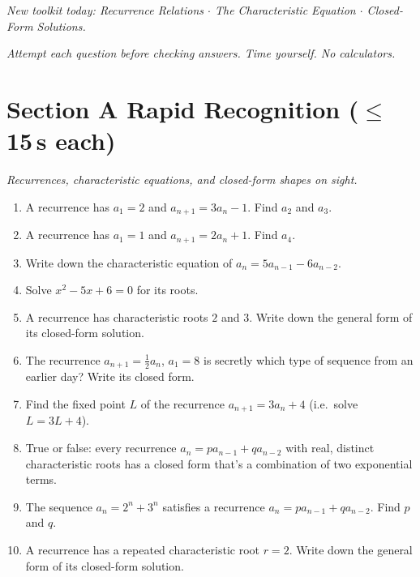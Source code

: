 \documentclass[11pt,a4paper]{article}
\begin{document}
\noindent\textit{New toolkit today: Recurrence Relations $\cdot$ The Characteristic Equation $\cdot$ Closed-Form Solutions.}

\vspace{2pt}
\noindent\textit{Attempt each question before checking answers. Time yourself. No calculators.}

\section*{Section A \quad Rapid Recognition \hfill{\normalfont\small($\leq$15\,s each)}}

\noindent\textit{Recurrences, characteristic equations, and closed-form shapes on sight.}

\begin{enumerate}

\item A recurrence has $a_1=2$ and $a_{n+1}=3a_n-1$. Find $a_2$ and $a_3$.

\item A recurrence has $a_1=1$ and $a_{n+1}=2a_n+1$. Find $a_4$.

\item Write down the characteristic equation of $a_n=5a_{n-1}-6a_{n-2}$.

\item Solve $x^2-5x+6=0$ for its roots.

\item A recurrence has characteristic roots $2$ and $3$. Write down the general form of its closed-form solution.

\item The recurrence $a_{n+1}=\tfrac12a_n$, $a_1=8$ is secretly which type of sequence from an earlier day? Write its closed form.

\item Find the fixed point $L$ of the recurrence $a_{n+1}=3a_n+4$ (i.e.\ solve $L=3L+4$).

\item True or false: every recurrence $a_n=pa_{n-1}+qa_{n-2}$ with real, distinct characteristic roots has a closed form that's a combination of two exponential terms.

\item The sequence $a_n=2^n+3^n$ satisfies a recurrence $a_n=pa_{n-1}+qa_{n-2}$. Find $p$ and $q$.

\item A recurrence has a repeated characteristic root $r=2$. Write down the general form of its closed-form solution.

\end{enumerate}
\end{document}
